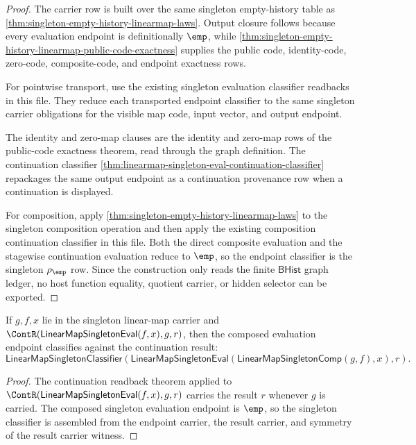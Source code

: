 \begin{proof}
The carrier row is built over the same singleton empty-history table as
\autoref{thm:singleton-empty-history-linearmap-laws}. Output closure follows
because every evaluation endpoint is definitionally $\emp$, while
\autoref{thm:singleton-empty-history-linearmap-public-code-exactness} supplies
the public code, identity-code, zero-code, composite-code, and endpoint
exactness rows.

For pointwise transport, use the existing singleton evaluation classifier
readbacks in this file. They reduce each transported endpoint classifier to
the same singleton carrier obligations for the visible map code, input vector,
and output endpoint.

The identity and zero-map clauses are the identity and zero-map rows of the
public-code exactness theorem, read through the graph definition. The
continuation classifier
\autoref{thm:linearmap-singleton-eval-continuation-classifier} repackages the
same output endpoint as a continuation provenance row when a continuation is
displayed.

For composition, apply
\autoref{thm:singleton-empty-history-linearmap-laws} to the singleton
composition operation and then apply the existing composition continuation
classifier in this file. Both the direct composite evaluation and the
stagewise continuation evaluation reduce to $\emp$, so the endpoint classifier
is the singleton $\rho_{\emp}$ row. Since the construction only reads the
finite $\mathsf{BHist}$ graph ledger, no host function equality, quotient
carrier, or hidden selector can be exported.
\end{proof}

\begin{theorem}
\label{thm:linearmap-singleton-eval-comp-continuation-classifier}
If $g,f,x$ lie in the singleton linear-map carrier and
$\ContR(\mathsf{LinearMapSingletonEval}(f,x),g,r)$, then the composed
evaluation endpoint classifies against the continuation result:
$$
\mathsf{LinearMapSingletonClassifier}
(\mathsf{LinearMapSingletonEval}(\mathsf{LinearMapSingletonComp}(g,f),x),r).
$$
\end{theorem}
\begin{proof}
The continuation readback theorem applied to
$\ContR(\mathsf{LinearMapSingletonEval}(f,x),g,r)$ carries the result $r$
whenever $g$ is carried. The composed singleton evaluation endpoint is
$\emp$, so the singleton classifier is assembled from the endpoint carrier,
the result carrier, and symmetry of the result carrier witness.
\end{proof}

